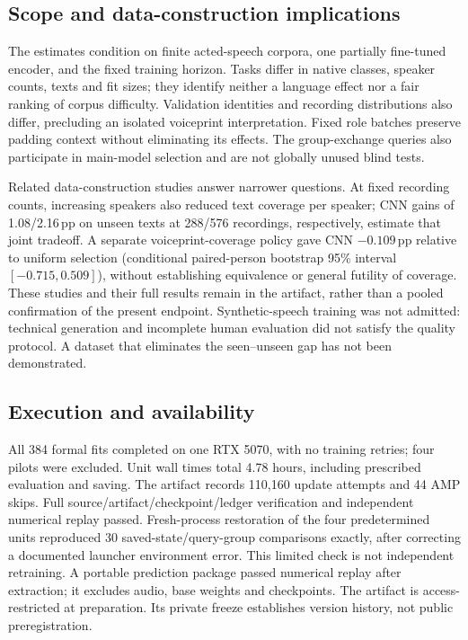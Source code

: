 \documentclass[letterpaper]{article}
\begin{document}
\subsection{Scope and data-construction implications}
The estimates condition on finite acted-speech corpora, one partially fine-tuned encoder, and the fixed training horizon. Tasks differ in native classes, speaker counts, texts and fit sizes; they identify neither a language effect nor a fair ranking of corpus difficulty. Validation identities and recording distributions also differ, precluding an isolated voiceprint interpretation. Fixed role batches preserve padding context without eliminating its effects. The group-exchange queries also participate in main-model selection and are not globally unused blind tests.

Related data-construction studies answer narrower questions. At fixed recording counts, increasing speakers also reduced text coverage per speaker; CNN gains of 1.08/2.16\,pp on unseen texts at 288/576 recordings, respectively, estimate that joint tradeoff. A separate voiceprint-coverage policy gave CNN $-0.109$\,pp relative to uniform selection (conditional paired-person bootstrap 95\% interval $[-0.715,0.509]$), without establishing equivalence or general futility of coverage. These studies and their full results remain in the artifact, rather than a pooled confirmation of the present endpoint. Synthetic-speech training was not admitted: technical generation and incomplete human evaluation did not satisfy the quality protocol. A dataset that eliminates the seen--unseen gap has not been demonstrated.

\subsection{Execution and availability}
All 384 formal fits completed on one RTX 5070, with no training retries; four pilots were excluded. Unit wall times total 4.78 hours, including prescribed evaluation and saving. The artifact records 110,160 update attempts and 44 AMP skips. Full source/artifact/checkpoint/ledger verification and independent numerical replay passed. Fresh-process restoration of the four predetermined units reproduced 30 saved-state/query-group comparisons exactly, after correcting a documented launcher environment error. This limited check is not independent retraining. A portable prediction package passed numerical replay after extraction; it excludes audio, base weights and checkpoints. The artifact is access-restricted at preparation. Its private freeze establishes version history, not public preregistration.
\end{document}
